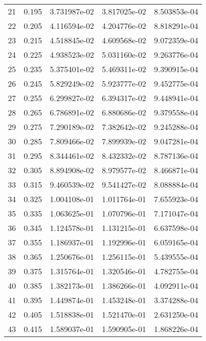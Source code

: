 \begin{table}[ht]
\begin{tabular}{rcccc}
    21 &  0.195 &    3.731987e-02 &    3.817025e-02  &     8.503853e-04\\ 
    22 &  0.205 &    4.116594e-02 &    4.204776e-02  &     8.818291e-04\\ 
    23 &  0.215 &    4.518845e-02 &    4.609568e-02  &     9.072359e-04\\ 
    24 &  0.225 &    4.938523e-02 &    5.031160e-02  &     9.263776e-04\\ 
    25 &  0.235 &    5.375401e-02 &    5.469311e-02  &     9.390915e-04\\ 
    26 &  0.245 &    5.829249e-02 &    5.923777e-02  &     9.452775e-04\\ 
    27 &  0.255 &    6.299827e-02 &    6.394317e-02  &     9.448941e-04\\ 
    28 &  0.265 &    6.786891e-02 &    6.880686e-02  &     9.379558e-04\\ 
    29 &  0.275 &    7.290189e-02 &    7.382642e-02  &     9.245288e-04\\ 
    30 &  0.285 &    7.809466e-02 &    7.899939e-02  &     9.047281e-04\\ 
    31 &  0.295 &    8.344461e-02 &    8.432332e-02  &     8.787136e-04\\ 
    32 &  0.305 &    8.894908e-02 &    8.979577e-02  &     8.466871e-04\\ 
    33 &  0.315 &    9.460539e-02 &    9.541427e-02  &     8.088884e-04\\ 
    34 &  0.325 &    1.004108e-01 &    1.011764e-01  &     7.655923e-04\\ 
    35 &  0.335 &    1.063625e-01 &    1.070796e-01  &     7.171047e-04\\ 
    36 &  0.345 &    1.124578e-01 &    1.131215e-01  &     6.637598e-04\\ 
    37 &  0.355 &    1.186937e-01 &    1.192996e-01  &     6.059165e-04\\ 
    38 &  0.365 &    1.250676e-01 &    1.256115e-01  &     5.439555e-04\\ 
    39 &  0.375 &    1.315764e-01 &    1.320546e-01  &     4.782755e-04\\ 
    40 &  0.385 &    1.382173e-01 &    1.386266e-01  &     4.092911e-04\\ 
    41 &  0.395 &    1.449874e-01 &    1.453248e-01  &     3.374288e-04\\ 
    42 &  0.405 &    1.518838e-01 &    1.521470e-01  &     2.631250e-04\\ 
    43 &  0.415 &    1.589037e-01 &    1.590905e-01  &     1.868226e-04\\ 

\end{tabular}
\end{table}
